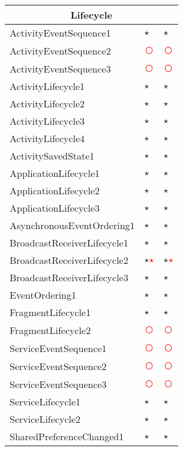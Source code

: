 \documentclass[../draft.tex]{subfiles}
\newcommand{\fp}{\textcolor{white}{\textcircled{\textcolor{red}{$\star$}}}}
\newcommand{\fn}{\textcolor{red}{\textcircled{ }}}
\newcommand{\tp}[0]{\textcircled{$\star$}}
\newcommand{\tsub}[1]{\multicolumn{3}{c}{#1}\\\hline}
\begin{document}
\begin{longtable}{l | l | l}
        \tsub{Lifecycle}
        ActivityEventSequence1 & \tp & \tp\\
        ActivityEventSequence2 & \fn & \fn\\
        ActivityEventSequence3 & \fn & \fn\\
        ActivityLifecycle1 & \tp & \tp\\
        ActivityLifecycle2 & \tp & \tp\\
        ActivityLifecycle3 & \tp & \tp\\
        ActivityLifecycle4 & \tp & \tp\\
        ActivitySavedState1 & \tp & \tp\\
        ApplicationLifecycle1 & \tp & \tp\\
        ApplicationLifecycle2 & \tp & \tp\\
        ApplicationLifecycle3 & \tp & \tp\\
        AsynchronousEventOrdering1 & \tp & \tp\\
        BroadcastReceiverLifecycle1 & \tp & \tp\\
        BroadcastReceiverLifecycle2 & \tp \fp & \tp \fp\\
        BroadcastReceiverLifecycle3 & \tp & \tp\\
        EventOrdering1 & \tp & \tp\\
        FragmentLifecycle1 & \tp & \tp\\
        FragmentLifecycle2 & \fn & \fn\\
        ServiceEventSequence1 & \fn & \fn\\
        ServiceEventSequence2 & \fn & \fn\\
        ServiceEventSequence3 & \fn & \fn\\
        ServiceLifecycle1 & \tp & \tp\\
        ServiceLifecycle2 & \tp & \tp\\
        SharedPreferenceChanged1 & \tp & \tp\\

\end{longtable}
\end{document}
